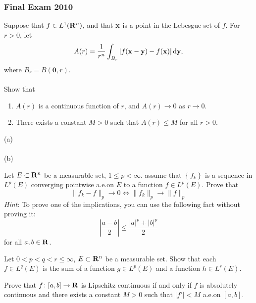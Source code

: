 \subsubsection{Final Exam 2010}
\setcounter{exercise}{0}
\setcounter{equation}{0}

\begin{problem}
Suppose that $f\in L^1(\mathbf{R}^n)$, and that $\mathbf{x}$ is a point in the Lebesgue
set of $f$. For $r>0$, let
\[
A(r)= \frac{1}{r^n}\int_{B_r}|f(\mathbf{x}-\mathbf{y})-f(\mathbf{x})|\mathop{}\!\mathrm{d}\mathbf{y},
\]
where $B_r= B(\mathbf{0},r)$.
\\\\
Show that
\begin{enumerate}[label=(\alph*),noitemsep]
\item $A(r)$ is a continuous function of $r$, and $A(r)\to 0$ as $r\to 0$.
\item There exists a constant $M>0$ such that $A(r)\leq M$ for all $r>0$.
\end{enumerate}
\end{problem}
\begin{solution}
(a)
\\\\
(b)
\end{solution}

\begin{problem}
Let $E\subset\mathbf{R}^n$ be a measurable set, $1\leq p<\infty$. assume that
$\left\{ f_k \right\}$ is a sequence in $L^p(E)$ converging pointwise
a.e.\@ on $E$ to a function $f\in L^p(E)$. Prove that
\[
\|f_k-f\|_p\longrightarrow 0\iff
\|f_k\|_p\longrightarrow\|f\|_p
\]
\emph{Hint}: To prove one of the implications, you can use the following
fact without proving it:
\[
\left|
\frac{a-b}{2}
\right|
\leq
\frac{|a|^p+|b|^p}{2}
\]
for all $a,b\in\mathbf{R}$.
\end{problem}
\begin{solution}
\end{solution}

\begin{problem}
Let $0<p<q<r\leq\infty$, $E\subset\mathbf{R}^n$ be a measurable set. Show that
each $f\in L^q(E)$ is the sum of a function $g\in L^p(E)$ and a function
$h\in L^r(E)$.
\end{problem}
\begin{solution}
\end{solution}

\begin{problem}
Prove that $f\colon[a,b]\to\mathbf{R}$ is Lipschitz continuous if and only if $f$
is absolutely continuous and there exists a constant $M>0$ such that
$|f'|<M$ a.e.\@ on $[a,b]$.
\end{problem}
\begin{solution}
\end{solution}

